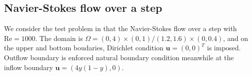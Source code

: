 \documentclass[mathpazo]{aamm}
\begin{document}


       

   \subsection{Navier-Stokes flow over a step}

      We consider the test problem in \cite{zheng2010adaptive} that the
      Navier-Stokes flow over a step with $\text{Re} = 1000$. The
      domain is $\Omega = (0, 4) \times (0, 1)/(1.2, 1.6) \times (0,
      0.4)$, and on the upper and bottom boudaries, Dirichlet
      condition $\mathbf{u} = (0, 0)^T$ is imposed. Outflow boundary is
      enforced natural boundary condition meanwhile at the inflow
      boundary $\mathbf{u} = (4 y (1 - y), 0)$.
\end{document}
